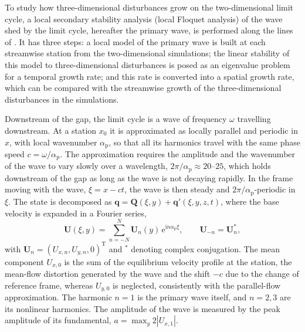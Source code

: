 \documentclass[lineno]{jfm}
\newcommand\awave{{\alpha_\mathrm{p}}} %
\begin{document}
To study how three-dimensional disturbances grow on the two-dimensional limit cycle, a local secondary stability analysis (local Floquet analysis) of the wave shed by the limit cycle, hereafter the primary wave, is performed along the lines of \citet{herbert1988}. It has three steps: a local model of the primary wave is built at each streamwise station from the two-dimensional simulations; the linear stability of this model to three-dimensional disturbances is posed as an eigenvalue problem for a temporal growth rate; and this rate is converted into a spatial growth rate, which can be compared with the streamwise growth of the three-dimensional disturbances in the simulations.

Downstream of the gap, the limit cycle is a wave of frequency $\omega$ travelling downstream. At a station $x_0$ it is approximated as locally parallel and periodic in $x$, with local wavenumber $\awave$, so that all its harmonics travel with the same phase speed $c=\omega/\awave$. The approximation requires the amplitude and the wavenumber of the wave to vary slowly over a wavelength, $2\pi/\awave\approx20$--$25$, which holds downstream of the gap as long as the wave is not decaying rapidly. In the frame moving with the wave, $\xi=x-ct$, the wave is then steady and $2\pi/\awave$-periodic in $\xi$. The state is decomposed as $\boldsymbol{q}=\boldsymbol{Q}(\xi,y)+\boldsymbol{q}'(\xi,y,z,t)$, where the base velocity is expanded in a Fourier series,
\begin{equation}\label{eq:secondaryBaseFlow}
	\boldsymbol{U}(\xi,y)=\sum_{n=-N}^{N}\boldsymbol{U}_n(y)\,\mathrm{e}^{\mathrm{i}n\awave\xi},
	\qquad
	\boldsymbol{U}_{-n}=\boldsymbol{U}_n^{*},
\end{equation}
with $\boldsymbol{U}_n={(U_{x,n},U_{y,n},0)}^\mathrm{T}$ and $^{*}$ denoting complex conjugation. The mean component $U_{x,0}$ is the sum of the equilibrium velocity profile at the station, the mean-flow distortion generated by the wave and the shift $-c$ due to the change of reference frame, whereas $U_{y,0}$ is neglected, consistently with the parallel-flow approximation. The harmonic $n=1$ is the primary wave itself, and $n=2,3$ are its nonlinear harmonics. The amplitude of the wave is measured by the peak amplitude of its fundamental, $a=\max_y 2|U_{x,1}|$.
\end{document}
